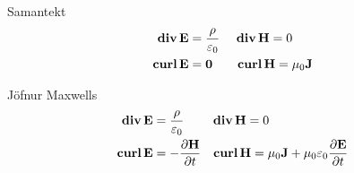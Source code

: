 \begin {frame}{Samantekt}
 \begin {align*}
  \dive \Ev &= \frac{\rho}{\epsilon_0} \quad~ \dive \Hv = 0 \\
  \curl \Ev &= \mathbf{0} \qquad \curl \Hv = \mu_0 \mathbf{J}
 \end {align*}

 Jöfnur Maxwells
 \begin {align*}
  \dive \Ev &= \frac{\rho}{\epsilon_0} \qquad ~ \dive \Hv = 0 \\
  \curl \Ev &= -\frac{\partial \Hv}{\partial t} \quad \curl \Hv = \mu_0 \mathbf{J} + \mu_0 \epsilon_0  \frac{\partial\Ev}{\partial t}
 \end {align*}

\end {frame}



